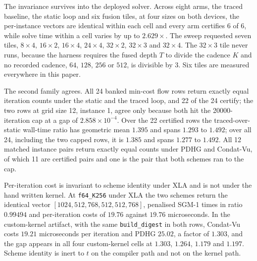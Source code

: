 The invariance survives into the deployed solver. Across eight arms, the traced
baseline, the static loop and six fusion tiles, at four sizes on both devices,
the per-instance vectors are identical within each cell and every arm certifies
6 of 6, while solve time within a cell varies by up to $2.629\times$. The sweep
requested seven tiles, $8\times4$, $16\times2$, $16\times4$, $24\times4$,
$32\times2$, $32\times3$ and $32\times4$. The $32\times3$ tile never runs,
because the harness requires the fused depth $T$ to divide the cadence $K$ and
no recorded cadence, $64$, $128$, $256$ or $512$, is divisible by 3. Six tiles
are measured everywhere in this paper.

The second family agrees. All 24 banked min-cost flow rows return exactly equal
iteration counts under the static and the traced loop, and 22 of the 24
certify; the two rows at grid size 12, instance 1, agree only because both hit
the 20000-iteration cap at a gap of $2.858 \times 10^{-4}$. Over the 22
certified rows the traced-over-static wall-time ratio has geometric mean
$1.395$ and spans $1.293$ to $1.492$; over all 24, including the two capped
rows, it is $1.385$ and spans $1.277$ to $1.492$. All 12 matched instance pairs
return exactly equal counts under PDHG and Condat-Vu, of which 11 are certified
pairs and one is the pair that both schemes ran to the cap.

Per-iteration cost is invariant to scheme identity under XLA and is not under
the hand written kernel. At \texttt{f64\_K256} under XLA the two schemes return
the identical vector $[1024, 512, 768, 512, 512, 768]$, penalised SGM-1 times in
ratio $0.99494$ and per-iteration costs of $19.76$ against $19.76$
microseconds. In the custom-kernel artifact, with the same
\texttt{build\_digest} in both rows, Condat-Vu costs $19.21$ microseconds per
iteration and PDHG $25.02$, a factor of $1.303$, and the gap appears in all
four custom-kernel cells at $1.303$, $1.264$, $1.179$ and $1.197$. Scheme
identity is inert to $t$ on the compiler path and not on the kernel path.

